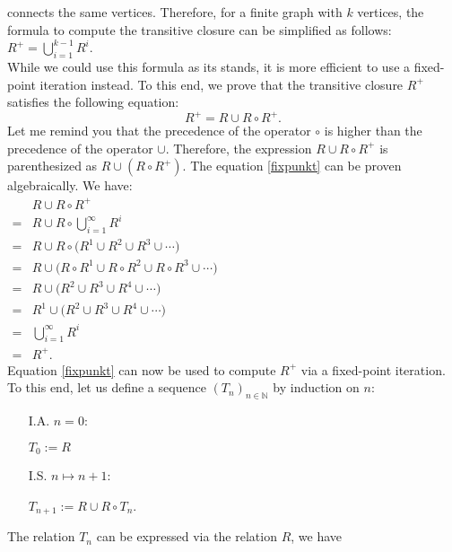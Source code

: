connects the same vertices.  Therefore, for a finite graph with $k$ vertices, the formula to compute the
transitive closure can be simplified as follows:
\\[0.2cm]
\hspace*{1.3cm} 
$R^+ = \bigcup\limits_{i=1}^{k-1} R^i$.
\\[0.2cm]
While we could use this formula as its stands, it is more efficient to use a fixed-point iteration instead.
To this end, we prove that the transitive closure $R^+$ satisfies the following equation:
\begin{equation}
  \label{fixpunkt}
  R^+ = R \cup R \circ R^+. 
\end{equation}
Let me remind you that the precedence of the operator $\circ$ 
is higher than the precedence of the operator $\cup$.  Therefore, the expression $R \cup R \circ R^+$ is parenthesized
as $R \cup (R \circ R^+)$.  The equation \ref{fixpunkt} can be proven algebraically.  We have:
\\[0.2cm]
\hspace*{1.3cm}
$
\begin{array}{cll}
    & R \cup R \circ R^+ \\[0.2cm]
  = & R \cup R \circ \bigcup\limits_{i=1}^{\infty} R^i \\[0.4cm]
  = & R \cup R \circ \bigl(R^1 \cup R^2 \cup R^3 \cup \cdots \bigr) \\[0.2cm]
  = & R \cup \bigl(R \circ R^1 \cup R \circ R^2 \cup R \circ R^3 \cup \cdots \bigr) \\[0.2cm]
  = & R \cup \bigl(R^2 \cup R^3 \cup  R^4 \cup \cdots \bigr)  \\[0.2cm]
  = & R^1 \cup \bigl(R^2 \cup R^3 \cup  R^4 \cup \cdots \bigr) \\[0.2cm]
  = & \bigcup\limits_{i=1}^{\infty} R^i \\[0.4cm]
  = & R^+.
\end{array}
$
\\[0.2cm]
Equation  \ref{fixpunkt} can now be used to compute $R^+$ via a fixed-point iteration.
To this end, let us define a sequence $(T_n)_{n \in \mathbb{N}}$ by induction on $n$:
\begin{enumerate}
\item[I.A.] $n = 0$: 

            $T_0 := R$
\item[I.S.] $n \mapsto n+1$:

            $T_{n+1} := R \cup R \circ T_n$. 
\end{enumerate}
The relation  $T_n$ can be expressed via the relation $R$, we have
